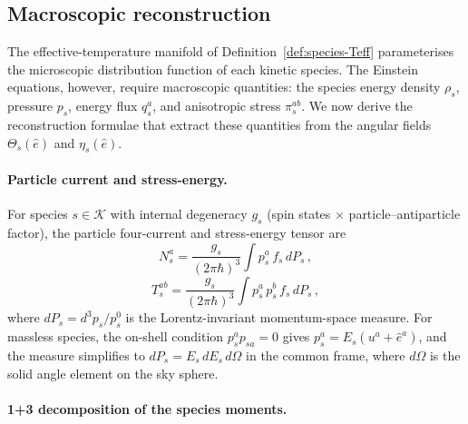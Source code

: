 \subsection{Macroscopic reconstruction}
\label{sec:macro-recon}

The effective-temperature manifold of
Definition~\ref{def:species-Teff} parameterises the
microscopic distribution function of each kinetic species.
The Einstein equations, however, require macroscopic
quantities: the species energy density $\rho_s$, pressure
$p_s$, energy flux $q_s^a$, and anisotropic stress
$\pi_s^{ab}$.  We now derive the reconstruction formulae
that extract these quantities from the angular fields
$\Theta_s(\hat{e})$ and $\eta_s(\hat{e})$.


\paragraph{Particle current and stress-energy.}

For species $s \in \mathcal{K}$ with internal degeneracy
$g_s$ (spin states $\times$ particle--antiparticle
factor), the particle four-current and stress-energy
tensor are
\begin{equation}\label{eq:Ns-def}
N_s^a
= \frac{g_s}{(2\pi\hbar)^3}
  \int p_s^a\, f_s\, dP_s\,,
\end{equation}
\begin{equation}\label{eq:Ts-def}
T_s^{ab}
= \frac{g_s}{(2\pi\hbar)^3}
  \int p_s^a\, p_s^b\, f_s\, dP_s\,,
\end{equation}
where $dP_s = d^3 p_s / p_s^0$ is the Lorentz-invariant
momentum-space measure.  For massless species, the
on-shell condition $p_s^a p_{sa} = 0$ gives
$p_s^a = E_s(u^a + \hat{e}^a)$, and the measure
simplifies to $dP_s = E_s\, dE_s\, d\Omega$ in the
common frame, where $d\Omega$ is the solid angle element
on the sky sphere.


\paragraph{1+3 decomposition of the species moments.}

